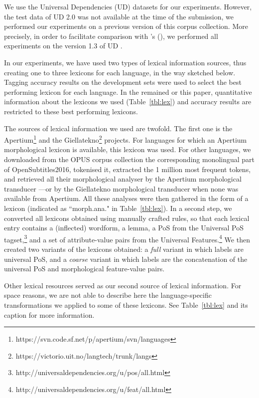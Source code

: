\documentclass[11pt,letterpaper]{article}
\begin{document}
We use the Universal Dependencies (UD) datasets for our experiments. However, the test data of UD 2.0 was not available
at the time of the submission, we performed our experiments on a previous version of this corpus collection. More
precisely, in order to facilitate comparison with \citeauthor{plank16}'s (\citeyear{plank16}), we performed all
experiments on the version 1.3 of UD \cite{ud13}.

In our experiments, we have used two types of lexical information sources, thus creating one to three lexicons for each
language, in the way sketched below. Tagging accuracy results on the development sets were used to select the best
performing lexicon for each language. In the remained or this paper, quantitative information about the lexicons we used
(Table~\ref{tbl:lex}) and accuracy results are restricted to these best performing lexicons.

The sources of lexical information we used are twofold. The first one is the
Apertium\footnote{https://svn.code.sf.net/p/apertium/svn/languages} and the
Giellatekno\footnote{https://victorio.uit.no/langtech/trunk/langs} projects. For languages for which an Apertium
morphological lexicon is available, this lexicon was used. For other languages, we downloaded from the OPUS corpus
collection the corresponding monolingual part of OpenSubtitles2016, tokenised it, extracted the 1 million most frequent
tokens, and retrieved all their morphological analyser by the Apertium morphological transducer ---or by the Giellatekno
morphological transducer when none was available from Apertium. All these analyses were then gathered in the form of a
lexicon (indicated as ``morph.ana." in Table~\ref{tbl:lex}). In a second step, we converted all lexicons obtained using
manually crafted rules, so that each lexical entry contains a (inflected) wordform, a lemma, a PoS from the Universal
PoS tagset,\footnote{http://universaldependencies.org/u/pos/all.html} and a set of attribute-value pairs from the
Universal Features.\footnote{http://universaldependencies.org/u/feat/all.html} We then created two variants of the
lexicons obtained: a {\em full} variant in which labels are universal PoS, and a {\em coarse} variant in which labels
are the concatenation of the universal PoS and morphological feature-value pairs.

Other lexical resources served as our second source of lexical information. For space reasons, we are not able to
describe here the language-specific transformations we applied to some of these lexicons. See Table~\ref{tbl:lex} and
its caption for more information.
\end{document}
